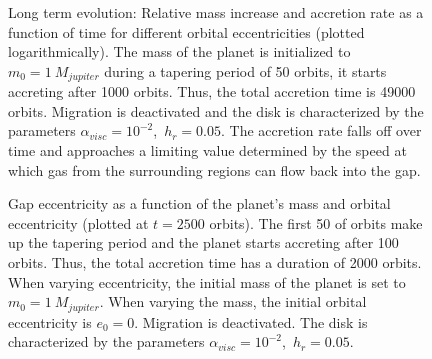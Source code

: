       \clearpage 
      \begin{figure}[h!]
        \centering
        \begin{minipage}{.5\linewidth}
          \centering
        \end{minipage}%
        \begin{minipage}{.5\linewidth}
          \centering
        \end{minipage}
        \caption{
          Long term evolution: Relative mass increase and accretion rate as a 
          function of time for different orbital eccentricities (plotted 
          logarithmically). The mass of the planet is initialized to 
          $m_0=1\ M_{jupiter}$ during a tapering period of 50 orbits, it 
          starts accreting after 1000 orbits. Thus, the total accretion time 
          is 49000 orbits. Migration is
          deactivated and the disk is characterized by the parameters 
          $\alpha_{visc}=10^{-2}$,\ $h_r=0.05$.
          The accretion rate falls off over time and approaches a limiting value 
          determined by the speed at which gas from the surrounding regions 
          can flow back into the gap.
        }
        \label{fig:acc_50000}
      \end{figure}

      \begin{figure}[h!]
        \centering
        \begin{minipage}{.5\linewidth}
          \centering
        \end{minipage}%
        \begin{minipage}{.5\linewidth}
          \centering
        \end{minipage}
          \caption{Gap eccentricity as a function of the planet's mass
            and orbital eccentricity (plotted at $t=2500$ orbits).
            The first 50 of orbits make up the tapering 
            period and the planet starts 
            accreting after 100 orbits. Thus, the total accretion time 
            has a duration of 
            2000 orbits. When varying eccentricity, the initial mass of the 
            planet is set to $m_0=1\ M_{jupiter}$. When varying the mass, 
            the initial orbital eccentricity is $e_0=0$. Migration is 
            deactivated. The disk is characterized by the parameters 
            $\alpha_{visc}=10^{-2}$,\ $h_r=0.05$.
          }
          \label{fig:gap_ecc}
      \end{figure}
        
